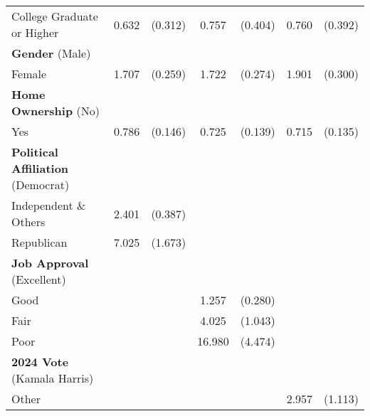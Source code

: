 \begin{table}[htbp]
\begin{tabular}{l*{3}{cc}}
College Graduate or Higher&       0.632         &     (0.312)&       0.757         &     (0.404)&       0.760         &     (0.392)\\
\textbf{Gender} (Male) & & &  &  &     &  \\
Female              &       1.707\sym{***}&     (0.259)&       1.722\sym{***}&     (0.274)&       1.901\sym{***}&     (0.300)\\
\textbf{Home Ownership} (No) & & &  &  &     &  \\
Yes                 &       0.786         &     (0.146)&       0.725\sym{*}  &     (0.139)&       0.715\sym{*}  &     (0.135)\\

\textbf{Political Affiliation} (Democrat)& & &  &  &     &  \\
Independent \& Others&       2.401\sym{***}&     (0.387)&                     &            &                     &            \\
Republican          &       7.025\sym{***}&     (1.673)&                     &            &                     &            \\

\textbf{Job Approval} (Excellent) & & &  &  &     &  \\
Good                &                     &            &       1.257         &     (0.280)&                     &            \\
Fair                &                     &            &       4.025\sym{***}&     (1.043)&                     &            \\
Poor                &                     &            &      16.980\sym{***}&     (4.474)&                     &            \\
\textbf{2024 Vote} (Kamala Harris) & & &  &  &     &  \\
Other              &                     &            &                     &            &       2.957\sym{***}&     (1.113)\\


\end{tabular}
\end{table}
